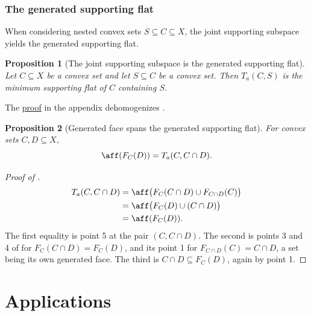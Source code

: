 \documentclass{article}
\theoremstyle{plain}
\newtheorem{proposition}[proposition]{Proposition}
\theoremstyle{definition}
\theoremstyle{remark}
\begin{document}
\subsubsection{The generated supporting flat}
\label{loc:body.lattice_minima.the_joint_supporting_subspace.the_generated_supporting_flat}
When considering nested convex sets $S \subseteq C \subseteq X$, the joint supporting subspace yields the generated supporting flat.
\begin{proposition}[The joint supporting subspace is the generated supporting flat]
\label{loc:the_joint_supporting_subspace_is_the_generated_supporting_flat.statement}
Let $C \subseteq X$ be a convex set and let $S \subseteq C$ be a convex set. Then $T_a(C,S)$ is the minimum supporting flat of $C$ containing $S$.
\end{proposition}
The \hyperlink{loc:the_joint_supporting_subspace_is_the_generated_supporting_flat.proof}{proof} in the appendix dehomogenizes .
\begin{proposition}[Generated face spans the generated supporting flat]
\label{loc:generated_face_spans_the_generated_supporting_flat.statement}
For convex sets $C, D \subseteq X$,
\begin{equation*}
\aff(F_C(D)) = T_a(C, C \cap D).
\end{equation*}
\end{proposition}
\begin{proof}[\hypertarget{loc:generated_face_spans_the_generated_supporting_flat.proof}{}Proof of ]

\begin{align*}
T_a(C, C \cap D) &= \aff\bigl(F_C(C \cap D) \cup F_{C \cap D}(C)\bigr)\\
&= \aff\bigl(F_C(D) \cup (C \cap D)\bigr)\\
&= \aff(F_C(D)).
\end{align*}
The first equality is  point 5 at the pair $(C, C \cap D)$. The second is points 3 and 4 of  for $F_C(C \cap D) = F_C(D)$, and its point 1 for $F_{C \cap D}(C) = C \cap D$, a set being its own generated face. The third is $C \cap D \subseteq F_C(D)$, again by point 1.
\end{proof}
\section{Applications}
\label{loc:body.applications}
\end{document}
